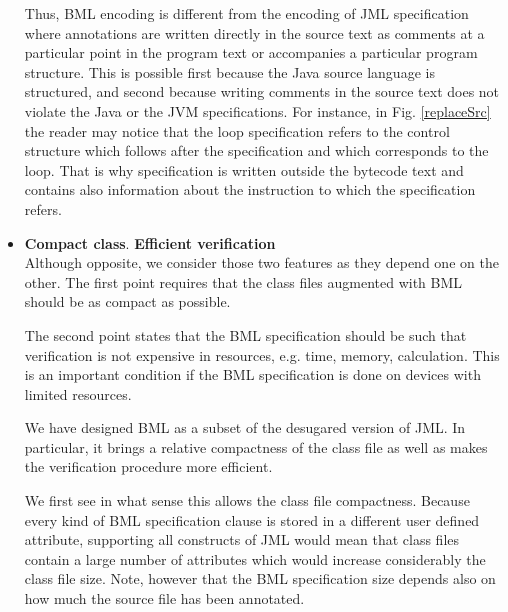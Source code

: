 \begin{itemize}
	    Thus, BML encoding is different from the encoding of   JML specification where
	    annotations are written directly in the source text as comments
	    at a particular point in the program text or accompanies a particular program structure.
	    This is possible first because
	    the Java source language is structured, and second because writing comments in the source text
	    does not violate the Java or the JVM  specifications. For instance, in Fig. \ref{replaceSrc} the
	    reader may notice that the loop specification
	    refers to the control structure which follows after the specification and which corresponds to the loop.
	    That is why specification is written outside the bytecode text and contains also information about
	    the instruction to which the specification refers.


\item \textbf{Compact class}. \textbf{Efficient verification}\\
      Although opposite, we consider those two features as they depend one on the other. 
      The first point requires that the class files augmented with BML should be as compact as possible.  
      
      The second point states that the BML specification should be such that 
      verification is not expensive in resources, e.g. time, memory, calculation. 
      This is an important condition if the BML specification is done  on devices
      with limited resources.

      We have designed BML as a subset of the desugared version of JML.
      In particular, it brings a relative compactness of the class
      file as well as makes the verification procedure more efficient. 
	   
      We first see in what sense this allows the class file compactness. 
      Because every kind of BML specification clause is
      stored in a different user defined attribute, supporting all constructs of JML would 
      mean that class files contain a large number of attributes which would increase considerably the class file size.
      Note, however that the BML specification size depends also on how much the source file has been annotated. 
      

\end{itemize}
